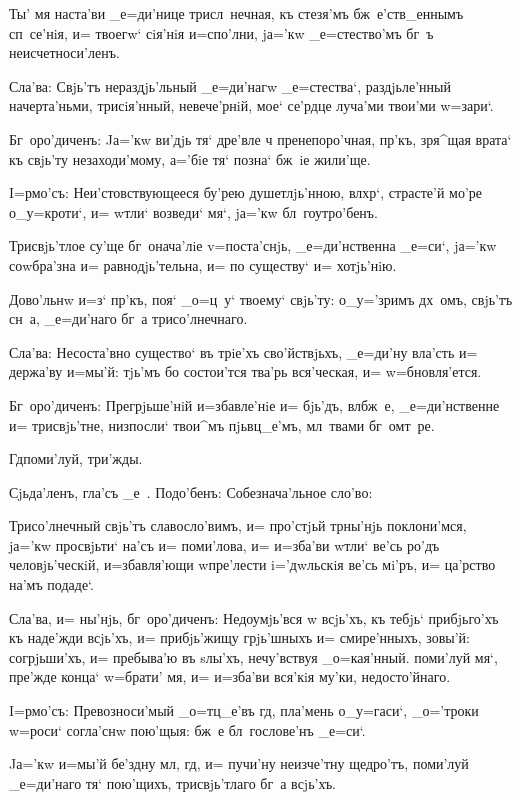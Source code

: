 Ты' мя наста'ви _е=ди'нице трисл~нечная, къ стезя'мъ 
бж~е'ств_еннымъ сп~се'нiя, и= твоегw` сiя'нiя и=спо'лни, 
jа='кw _е=стество'мъ бг~ъ неисчетноси'ленъ.

Сла'ва: Свjь'тъ нераздjь'льный _е=ди'нагw _е=стества`, 
раздjьле'нный начерта'ньми, трисiя'нный, невече'рнiй, 
мое` се'рдце луча'ми твои'ми w=зари`.

Бг~оро'диченъ: Jа='кw ви'дjь тя` дре'вле ч 
пренепоро'чная, пр'къ, зря^щая врата` къ свjь'ту 
незаходи'мому, а='бiе тя` позна` бж~iе жили'ще.


I=рмо'съ: Неи'стовствующееся бу'рею душетлjь'нною, 
вл хр`, страсте'й мо'ре о_у=кроти`, и= w\т тли` 
возведи` мя`, jа='кw бл~гоутро'бенъ.

Трисвjь'тлое су'ще бг~онача'лiе v=поста'снjь, 
_е=ди'нственна _е=си`, jа='кw соwбра'зна и= 
равнодjь'тельна, и= по существу` и= хотjь'нiю. 

Дово'льнw и=з` пр'къ, поя` _о=ц~у` твоему` 
свjь'ту: о_у='зримъ дх~омъ, свjь'тъ сн~а, _е=ди'наго бг~а 
трисо'лнечнаго. 

Сла'ва: Несоста'вно существо` въ трiе'хъ сво'йствjьхъ, 
_е=ди'ну вла'сть и= держа'ву и=мы'й: тjь'мъ бо состои'тся 
тва'рь вся'ческая, и= w=бновля'ется.

Бг~оро'диченъ: Прегрjьше'нiй и=збавле'нiе и= бjь'дъ, 
вл бж~е, _е=ди'нственне и= трисвjь'тне, низпосли` 
твои^мъ пjьвц_е'мъ, мл~твами бг~омт~ре.

Гд поми'луй, три'жды.

Сjьда'ленъ, гла'съ _е~. Подо'бенъ: Собезнача'льное 
сло'во:

Трисо'лнечный свjь'тъ славосло'вимъ, и= про'стjьй 
тр ны'нjь поклони'мся, jа='кw просвjьти` на'съ и= 
поми'лова, и= и=зба'ви w\т тли` ве'сь ро'дъ 
человjь'ческiй, и=збавля'ющи w\т пре'лести i='дwльскiя 
ве'сь мi'ръ, и= ца'рство на'мъ подаде`.

Сла'ва, и= ны'нjь, бг~оро'диченъ: Недоумjь'вся w\т 
всjь'хъ, къ тебjь` прибjьго'хъ къ наде'жди всjь'хъ, и= 
прибjь'жищу грjь'шныхъ и= смире'нныхъ, зовы'й: 
согрjьши'хъ, и= пребыва'ю въ sлы'хъ, нечу'вствуя 
_о=кая'нный. поми'луй мя`, пре'жде конца` w=брати' мя, и= 
и=зба'ви вся'кiя му'ки, недосто'йнаго.


I=рмо'съ: Превозноси'мый _о=тц_е'въ гд, пла'мень 
о_у=гаси`, _о='троки w=роси` согла'снw пою'щыя: бж~е 
бл~гослове'нъ _е=си`.

Jа='кw и=мы'й бе'здну мл, гд, и= пучи'ну 
неизче'тну щедро'тъ, поми'луй _е=ди'наго тя` пою'щихъ, 
трисвjь'тлаго бг~а всjь'хъ.

